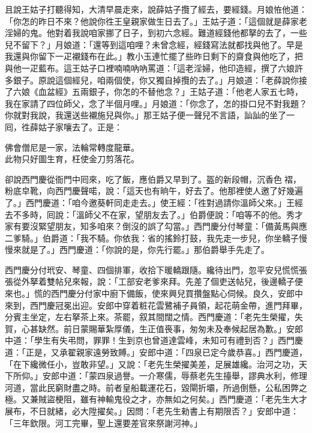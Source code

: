 且說王姑子打聽得知，大清早晨走來，說薛姑子攬了經去，要經錢。月娘恠他道：「你怎的昨日不來？他說你徃王皇親家做生日去了。」王姑子道：「這個就是薛家老淫婦的鬼。他對着我說咱家挪了日子，到初六念經。難道經錢他都拏的去了，一些兒不留下？」月娘道：「還等到這咱哩？未曾念經，經錢寫法就都找與他了。早是我還與你留下一疋襯錢布在此。」教小玉連忙擺了些昨日剩下的齋食與他吃了，把與他一疋藍布。這王姑子口裡喃喃吶吶罵道：「這老淫婦，他印造經，撰了六娘許多銀子。原說這個經兒，咱兩個使，你又獨自掉攬的去了。」{}月娘道：「老薛說你接了六娘《血盆經》五兩銀子，你怎的不替他念？」王姑子道：「他老人家五七時，我在家請了四位師父，念了半個月哩。」月娘道：「你念了，怎的掛口兒不對我題？你就對我說，我還送些襯施兒與你。」那王姑子便一聲兒不言語，訕訕的坐了一囘，{}徃薛姑子家嚷去了。正是：

\begin{myquote} 
佛會僧尼是一家，法輪常轉度龍華。\\此物只好圖生育，枉使金刀剪落花。
\end{myquote} 

卻說西門慶從衙門中囘來，吃了飯，應伯爵又早到了。盔的新段帽，沉香色𧜽褶，粉底皁靴，{}向西門慶聲喏，說：「這天也有晌午，好去了。他那裡使人邀了好幾遍了。」西門慶道：「咱今邀葵軒同走走去。」使王經：「徃對過請你溫師父來。」王經去不多時，囘說：「溫師父不在家，望朋友去了。」伯爵便說：「咱等不的他。秀才家有要沒緊望朋友，知多咱來？倒沒的誤了勾當。」西門慶分付琴童：「備黃馬與應二爹騎。」伯爵道：「我不騎。你依我：省的搖鈴打鼓，我先走一步兒，你坐轎子慢慢來就是了。」西門慶道：「你說的是，你先行罷。」那伯爵舉手先走了。

西門慶分付玳安、琴童、四個排軍，收拾下暖轎跟隨。纔待出門，忽平安兒慌慌張張從外拏着雙帖兒來報，說：「工部安老爹來拜。先差了個吏送帖兒，後邊轎子便來也。」慌的西門慶分付家中廚下備飯，使來興兒買攢盤點心伺候。良久，安郎中來到，西門慶冠冕出迎。安郎中穿着粧花雲鷺補子員領，起花萌金帶，進門拜畢，分賓主坐定，左右拏茶上來。茶罷，叙其間闊之情。西門慶道：「老先生榮擢，失賀，心甚缺然。前日蒙賜華紮厚儀，生正值䘮事，匆匆未及奉候起居為歉。」安郎中道：「學生有失弔問，罪罪！生到京也曾道達雲峰，未知可有禮到否？」西門慶道：「正是，又承翟親家遠勞致賻。」{}安郎中道：「四泉已定今歲恭喜。」西門慶道，「在下纔微任小，豈敢非望。」又說：「老先生榮擢美差，足展雄纔。治河之功，天下所仰。」安郎中道：「蒙四泉過譽。一介寒儒，辱蔡老先生擡舉，謬典水利，修理河道，當此民窮財盡之時。前者皇船載運花石，毀閘折壩，所過倒懸，公私困弊之極。又兼賊盜梗阻，雖有神輸鬼役之才，亦無如之何矣。」西門慶道：「老先生大才展布，不日就緒，必大陞擢矣。」因問：「老先生勑書上有期限否？」安郎中道：「三年欽限。河工完畢，聖上還要差官來祭謝河神。」

